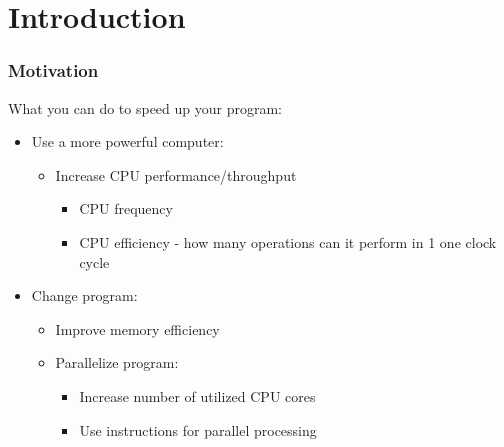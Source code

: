 \documentclass{beamer}
\subtitle{Lecture 01. Introduction}
\author{Pavel Píša \phantom{xxxxxxxxx} Petr Štěpán \\ \small\texttt{pisa@fel.cvut.cz}\phantom{xxxx}\small\texttt{stepan@fel.cvut.cz}}
\begin{document}
\maketitle

\section{Introduction}


\begin{frame}
\frametitle{Motivation}
What you can do to speed up your program:
\begin{itemize}
\item Use a more powerful computer:
  \begin{itemize}
  \item Increase CPU performance/throughput
    \begin{itemize}
    \item CPU frequency
    \item CPU efficiency - how many operations can it perform in 1 one clock cycle
    \end{itemize}
  \end{itemize}
\item Change program:
  \begin{itemize}
  \item Improve memory efficiency
  \item Parallelize program:
    \begin{itemize}
    \item Increase number of utilized CPU cores
    \item Use instructions for parallel processing
    \end{itemize}
  \end{itemize}
\end{itemize}
\end{frame}
\end{document}
